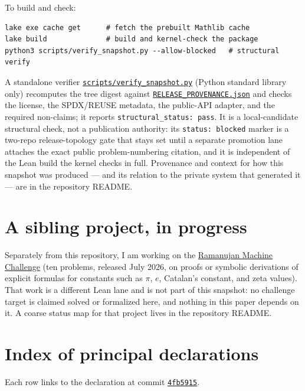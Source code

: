 \documentclass[11pt]{article}
\newcommand{\commit}{4fb5915f4b324c80c462e2b904236c39e2c32fe5}
\newcommand{\repobase}{https://github.com/wcook04/plectis-lean-erdos249-257/blob/\commit}
\theoremstyle{definition}
\theoremstyle{remark}
\begin{document}
To build and check:
\begin{verbatim}
lake exe cache get      # fetch the prebuilt Mathlib cache
lake build              # build and kernel-check the package
python3 scripts/verify_snapshot.py --allow-blocked   # structural verify
\end{verbatim}

A standalone verifier \href{\repobase/\detokenize{scripts/verify_snapshot.py}}{\texttt{scripts/verify\_snapshot.py}}
(Python standard library only) recomputes the tree digest against
\href{\repobase/\detokenize{RELEASE_PROVENANCE.json}}{\texttt{RELEASE\_PROVENANCE.json}} and
checks the license, the SPDX/REUSE metadata, the public-API adapter, and the
required non-claims; it reports \texttt{structural\_status: pass}. It is a
local-candidate structural check, not a publication authority: its
\texttt{status: blocked} marker is a two-repo release-topology gate that stays set
until a separate promotion lane attaches the exact public problem-numbering
citation, and it is independent of the Lean build the kernel checks in full.
Provenance and context for how this snapshot was produced --- and its relation to
the private system that generated it --- are in the repository README.

\section{A sibling project, in progress}\label{sec:ramanujan}

Separately from this repository, I am working on the
\href{https://www.ramanujanmachine.com/ramanujan-challenge/}{Ramanujan Machine
Challenge} (ten problems, released July 2026, on proofs or symbolic derivations of
explicit formulas for constants such as $\pi$, $e$, Catalan's constant, and zeta
values). That work is a different Lean lane and is not part of this snapshot: no
challenge target is claimed solved or formalized here, and nothing in this paper
depends on it. A coarse status map for that project lives in the repository README.

\appendix
\section{Index of principal declarations}\label{app:index}

Each row links to the declaration at commit \href{\repobase}{\texttt{4fb5915}}.
\end{document}
